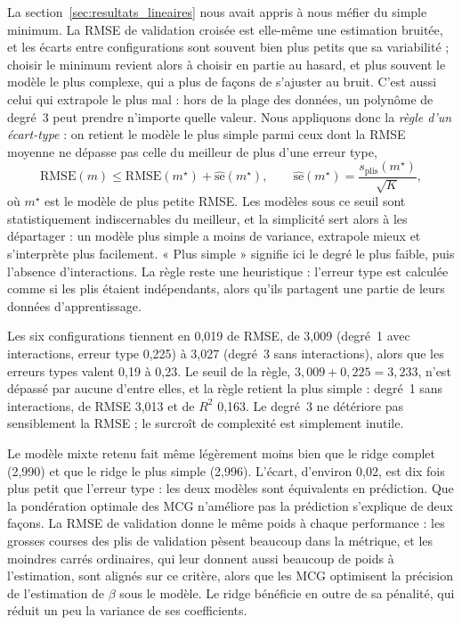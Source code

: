 \documentclass[11pt,a4paper]{article}
\begin{document}
La section~\ref{sec:resultats_lineaires} nous avait appris à nous méfier du simple minimum. La RMSE de validation
croisée est elle-même une estimation bruitée, et les écarts entre configurations sont souvent bien plus petits que sa
variabilité ; choisir le minimum revient alors à choisir en partie au hasard, et plus souvent le modèle le plus
complexe, qui a plus de façons de s'ajuster au bruit. C'est aussi celui qui extrapole le plus mal : hors de la plage
des données, un polynôme de degré~3 peut prendre n'importe quelle valeur. Nous appliquons donc la \emph{règle d'un
écart-type} \citep{breiman1984, hastie2009} : on retient le modèle le plus simple parmi ceux dont la RMSE moyenne ne
dépasse pas celle du meilleur de plus d'une erreur type,
\[
\mathrm{RMSE}(m) \le \mathrm{RMSE}(m^\star) + \widehat{\mathrm{se}}(m^\star),\qquad
\widehat{\mathrm{se}}(m^\star) = \frac{s_{\text{plis}}(m^\star)}{\sqrt K},
\]
où $m^\star$ est le modèle de plus petite RMSE. Les modèles sous ce seuil sont statistiquement indiscernables du
meilleur, et la simplicité sert alors à les départager : un modèle plus simple a moins de variance, extrapole mieux
et s'interprète plus facilement. « Plus simple » signifie ici le degré le plus faible, puis l'absence
d'interactions. La règle reste une heuristique : l'erreur type est calculée comme si les plis étaient indépendants,
alors qu'ils partagent une partie de leurs données d'apprentissage.

Les six configurations tiennent en 0,019 de RMSE, de 3,009 (degré~1 avec interactions, erreur type 0,225) à 3,027
(degré~3 sans interactions), alors que les erreurs types valent 0,19 à 0,23. Le seuil de la règle,
$3{,}009 + 0{,}225 = 3{,}233$, n'est dépassé par aucune d'entre elles, et la règle retient la plus simple : degré~1
sans interactions, de RMSE 3,013 et de $R^2$ 0,163. Le degré~3 ne détériore pas sensiblement la RMSE ; le surcroît de
complexité est simplement inutile.

Le modèle mixte retenu fait même légèrement moins bien que le ridge complet (2,990) et que le ridge le plus simple
(2,996). L'écart, d'environ 0,02, est dix fois plus petit que l'erreur type : les deux modèles sont équivalents en
prédiction. Que la pondération optimale des MCG n'améliore pas la prédiction s'explique de deux façons. La RMSE de
validation donne le même poids à chaque performance : les grosses courses des plis de validation pèsent beaucoup dans
la métrique, et les moindres carrés ordinaires, qui leur donnent aussi beaucoup de poids à l'estimation, sont alignés
sur ce critère, alors que les MCG optimisent la précision de l'estimation de $\beta$ sous le modèle. Le ridge
bénéficie en outre de sa pénalité, qui réduit un peu la variance de ses coefficients.
\end{document}
